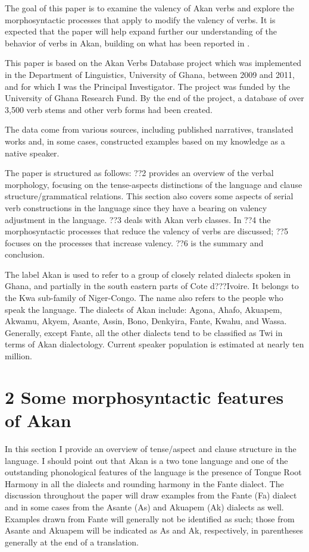 \documentclass[output=paper]{langsci/langscibook}
\begin{document}
The goal of this paper is to examine the valency of Akan verbs and explore the morphosyntactic processes that apply to modify the valency of verbs. It is expected that the paper will help expand further our understanding of the behavior of verbs in Akan, building on what has been reported in \citet{Osam2008a}. 

This paper is based on the Akan Verbs Database project which was implemented in the Department of Linguistics, University of Ghana, between 2009 and 2011, and for which I was the Principal Investigator. The project was funded by the University of Ghana Research Fund. By the end of the project, a database of over 3,500 verb stems and other verb forms had been created.

The data come from various sources, including published narratives, translated works and, in some cases, constructed examples based on my knowledge as a native speaker.

The paper is structured as follows: ??2 provides an overview of the verbal morphology, focusing on the tense-aspects distinctions of the language and clause structure/grammatical relations. This section also covers some aspects of serial verb constructions in the language since they have a bearing on valency adjustment in the language. ??3 deals with Akan verb classes. In ??4 the morphosyntactic processes that reduce the valency of verbs are discussed; ??5 focuses on the processes that increase valency. ??6 is the summary and conclusion.

The label Akan is used to refer to a group of closely related dialects spoken in Ghana, and partially in the south eastern parts of Cote d???Ivoire. It belongs to the Kwa sub-family of Niger-Congo. The name also refers to the people who speak the language. The dialects of Akan include: Agona, Ahafo, Akuapem, Akwamu, Akyem, Asante, Assin, Bono, Denkyira, Fante, Kwahu, and Wassa. Generally, except Fante, all the other dialects tend to be classified as Twi in terms of Akan dialectology. Current speaker population is estimated at nearly ten million.

\section[2  Some morphosyntactic features of Akan]{2  Some morphosyntactic features of Akan}
\begin{styleBodyTextIndent}
In this section I provide an overview of tense/aspect and clause structure in the language. I should point out that Akan is a two tone language and one of the outstanding phonological features of the language is the presence of Tongue Root Harmony in all the dialects and rounding harmony in the Fante dialect. The discussion throughout the paper will draw examples from the Fante (Fa) dialect and in some cases from the Asante (As) and Akuapem (Ak) dialects as well. Examples drawn from Fante will generally not be identified as such; those from Asante and Akuapem will be indicated as As and Ak, respectively, in parentheses generally at the end of a translation.
\end{styleBodyTextIndent}
\end{document}
